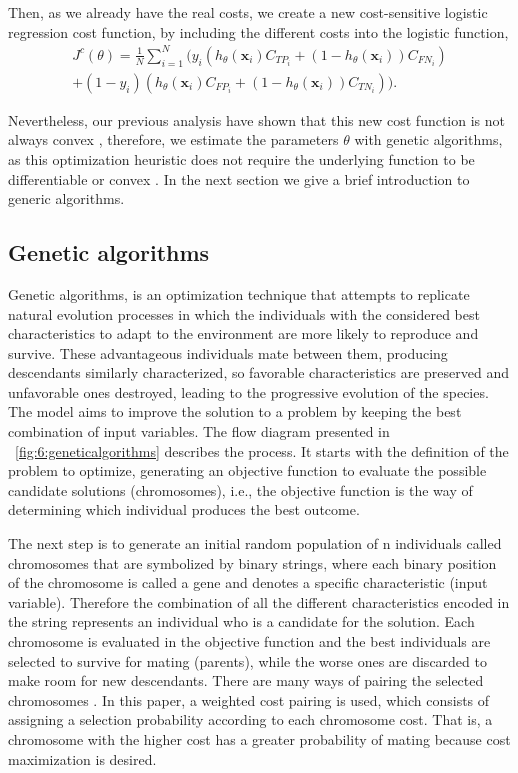 Then, as we already have the real costs, we create a new cost-sensitive logistic regression cost 
function, by including the different costs into the logistic function,
\begin{align}\label{eq:CSLR}
  J^c(\theta)=\frac{1}{N} \sum_{i=1}^{N} \bigg( y_i(h_\theta(\mathbf{x}_i) C_{TP_i} + 
  (1-h_\theta(\mathbf{x}_i))C_{FN_i})  \nonumber\\ 
  +(1-y_i)(h_\theta(\mathbf{x}_i) C_{FP_i} + (1-h_\theta(\mathbf{x}_i))C_{TN_i}) \bigg).
\end{align}

Nevertheless, our previous analysis have shown that this new cost function is not always convex 
\citep{CorreaBahnsen2014b}, therefore, we estimate the parameters $\theta$ with genetic algorithms, 
as this optimization heuristic does not require the underlying function to be differentiable or 
convex \citep{Haupt2004}. In the next section we give a brief introduction to generic algorithms.


\subsection{Genetic algorithms}
\label{sec:6:ga}

Genetic algorithms, is an optimization technique that attempts to replicate natural evolution 
processes in which the individuals with the considered best characteristics to adapt to the 
environment are more likely to reproduce and survive. These advantageous individuals mate between 
them, producing descendants similarly characterized, so favorable characteristics are preserved and 
unfavorable ones destroyed, leading to the progressive evolution of the species. The model aims 
to improve the solution to a problem by keeping the best combination of input variables. The 
flow diagram presented in \figurename{~\ref{fig:6:geneticalgorithms}} describes the process. It 
starts with the definition of the problem to optimize, generating an objective function to evaluate 
the possible candidate solutions (chromosomes), i.e., the objective function is the way of 
determining which individual produces the best outcome. 

The next step is to generate an initial random population of n individuals called chromosomes that 
are symbolized by binary strings, where each binary position of the chromosome is called a gene and 
denotes a specific characteristic (input variable). Therefore the combination of all the different 
characteristics encoded in the string represents an individual who is a candidate for the solution.
Each chromosome is evaluated in the objective function and the best individuals are selected to 
survive for mating (parents), while the worse ones are discarded to make room for new descendants.  
There are many ways of pairing the selected chromosomes \citep{Haupt2004}. In this paper, a weighted 
cost pairing is used, which consists of assigning a selection probability according to each 
chromosome cost. That is, a chromosome with the higher cost has a greater probability of mating 
because cost maximization is desired.

